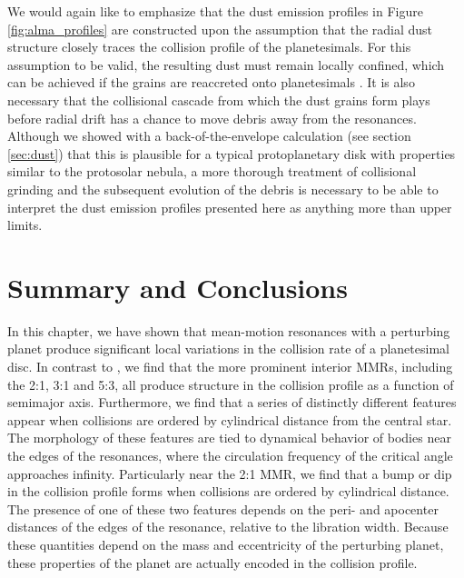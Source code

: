 We would again like to emphasize that the dust emission profiles in Figure \ref{fig:alma_profiles} are constructed upon the 
assumption that the radial dust structure closely traces the collision profile of the planetesimals. For this assumption to be valid, 
the resulting dust must remain locally confined, which can be achieved if the grains are reaccreted onto planetesimals 
\cite{johansen15}. It is also necessary that the collisional cascade from which the dust grains form plays before radial drift has a 
chance to move debris away from the resonances. Although we showed with a back-of-the-envelope calculation (see section 
\ref{sec:dust}) that this is plausible for a typical protoplanetary disk with properties similar to the protosolar nebula, a more 
thorough treatment of collisional grinding and the subsequent evolution of the debris is necessary to be able to interpret the dust 
emission profiles presented here as anything more than upper limits.

\section{Summary and Conclusions}\label{sec:conclusions}

In this chapter, we have shown that mean-motion resonances with a perturbing planet produce significant local variations in the 
collision rate of a planetesimal disc. In contrast to \cite{richardson00}, we find that the more prominent interior MMRs, including 
the 2:1, 3:1 and 5:3, all produce structure in the collision profile as a function of semimajor axis. Furthermore, we find that a 
series of distinctly different features appear when collisions are ordered by cylindrical distance from the central star. The 
morphology of these features are tied to dynamical behavior of bodies near the edges of the resonances, where the circulation 
frequency of the critical angle approaches infinity. Particularly near the 2:1 MMR, we find that a bump or dip in the collision 
profile forms when collisions are ordered by cylindrical distance. The presence of one of these two features depends on the peri- 
and apocenter distances of the edges of the resonance, relative to the libration width. Because these quantities depend on the 
mass and eccentricity of the perturbing planet, these properties of the planet are actually encoded in the collision profile.


